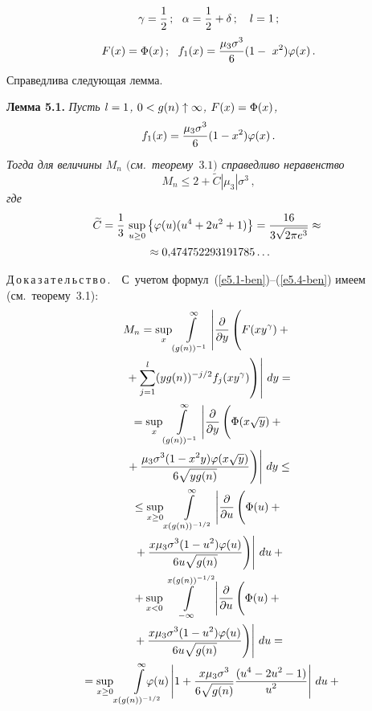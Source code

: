 \begin{multicols}{2}
\noindent
\begin{gather}
\gamma = \displaystyle\frac{\displaystyle 1\mathstrut}{\displaystyle 2\mathstrut}\,; \ \   \alpha = \displaystyle\frac{\displaystyle 1\mathstrut}{\displaystyle 2\mathstrut} +\delta\,; \ \ \   l = 1\,;
\label{e5.3-ben}
\\
F(x) = \Phi(x)\,;\ \    f_1(x) = \displaystyle\frac{\displaystyle \mu_3 \sigma^3\mathstrut}{\displaystyle 6\mathstrut} (1 -\ x^2)
\varphi(x)\,. \label{e5.4-ben}
\end{gather}
Справедлива следующая лемма.

\smallskip

\noindent
\textbf{Лемма 5.1.} \textit{Пусть $l \hm= 1$,  $0 \hm< g(n) \uparrow \infty$,
$F(x) \hm= \Phi(x)$,
$$
f_1(x) = \displaystyle\frac{\displaystyle \mu_3 \sigma^3\mathstrut}{\displaystyle 6\mathstrut} (1 - x^2) \varphi(x)\,.
$$
Тогда для величины $M_n$ $($см.\ теорему~$3.1)$ справедливо
неравенство
$$
M_n \le  2 + \widetilde C|\mu_3|\sigma^3\,,
$$
где}
\begin{multline*}
\widetilde C = \displaystyle\frac{\displaystyle 1\mathstrut}{\displaystyle 3\mathstrut}\,\sup\limits_{u\ge0}
\left\{\varphi(u)(u^4+2u^2+1)\right\}=\displaystyle\frac{\displaystyle 16\mathstrut}{\displaystyle 3\sqrt{2\pi
e^3}\mathstrut}\approx {}\\
{}\approx 0{,}474752293191785\ldots
\end{multline*}


\smallskip

\noindent
Д\,о\,к\,а\,з\,а\,т\,е\,л\,ь\,с\,т\,в\,о\,.\ \  С~учетом формул~(\ref{e5.1-ben})--(\ref{e5.4-ben}) 
имеем (см.\ теорему~3.1):
\begin{multline*}
M_n = \sup\limits_x \int\limits_{(g(n))^{-1}}^\infty
\left|
\fr{\partial}{\partial y} \left( \vphantom{\sum\limits_{j=1}^l}
F(xy^\gamma) + {}\right.\right.\\
\left.\left.{}+\sum\limits_{j=1}^l
(yg(n))^{-j/2} f_j(xy^\gamma)\right)\right|\, dy  ={}
\\
{}= \sup\limits_x \int\limits_{(g(n))^{-1}}^\infty
\left|\fr{\partial}{\partial y} \left(
\vphantom{\fr{\mu_3\sigma^3(1-x^2 y)\varphi(x\sqrt y)}{6
\sqrt{yg(n)}}}
\Phi(x\sqrt y) +{}\right.\right.\\
\left.\left.{}+
\fr{\mu_3\sigma^3(1-x^2 y)\varphi(x\sqrt y)}{6
\sqrt{yg(n)}}\right)\right|\, dy \le{}
\\
{}\le \sup\limits_{x\ge0} \int\limits_{x(g(n))^{-1/2}}^\infty
\left|\fr{\partial}{\partial u} \left(
\vphantom{\fr{x\mu_3\sigma^3(1-u^2)\varphi(u)}{6u \sqrt{g(n)}}}
\Phi(u) +{}\right.\right.\\
\left.\left.{}+\fr{x\mu_3\sigma^3(1-u^2)\varphi(u)}{6u \sqrt{g(n)}}\right)\right|
\,du +{}
\\
{}+ \sup\limits_{x<0} \int\limits_{-\infty}^{x(g(n))^{-1/2}}
\left|\fr{\partial}{\partial u} \left(
\vphantom{\fr{x\mu_3\sigma^3(1-u^2)\varphi(u)}{6u \sqrt{g(n)}}}
\Phi(u) +{}\right.\right.\\
\left.\left.{}+
\fr{x\mu_3\sigma^3(1-u^2)\varphi(u)}{6u \sqrt{g(n)}}\right)\right|
\,du ={}
\\
{}= \sup\limits_{x\ge0} \int\limits_{x(g(n))^{-1/2}}^\infty \!\!\!\!\!\!\!\!\!\!\varphi(u)
\left|1 + \fr{x\mu_3\sigma^3}{6
\sqrt{g(n)}}\fr{(u^4-2u^2-1)}{u^2}\right|\, du +{}\hspace*{-5.40286pt}
\end{multline*}


\end{multicols}
